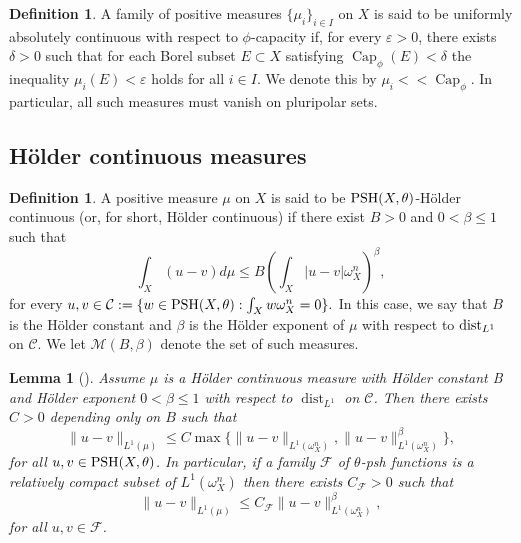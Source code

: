 \documentclass[a4paper,11pt]{amsart}
\numberwithin{equation}{section}
\newtheorem{proposition}[theorem]{Proposition}
\newtheorem{lemma}[theorem]{Lemma}
\theoremstyle{definition}
\newtheorem{definition}[theorem]{Definition}
\newcommand{\dist}{\mathop{\mathrm{dist}}\nolimits}
\newcommand{\PSH}{{\rm PSH}}
\newcommand{\capacity}{\mathop{\mathrm{Cap}}\nolimits}
\begin{document}
\begin{definition}
A family of positive measures $\{\mu_i \}_{i\in I}$ on $X$ is said to be uniformly absolutely
continuous with respect to $\phi$-capacity if, for every $\varepsilon>0$, there exists $\delta>0$ such that for each Borel subset $E\subset X$ satisfying $\capacity_\phi(E)<\delta$ the inequality $\mu_i(E)<\varepsilon$ holds for all $i\in I$. We denote this by $\mu_i<<\capacity_\phi$. In particular, all such measures must
vanish on pluripolar sets.
\end{definition}

\subsection{H\"older continuous measures}
\begin{definition}\label{def: holder}
	A positive measure $\mu$ on $X$ is said to be $\PSH(X, \theta)$-H\"older continuous
	(or, for short, H\"older continuous) if there exist $B>0$ and $0<\beta\leq 1$ such that
	\begin{equation*}
	    \int_{X}(u-v)d\mu\leq B \left(\int_X|u-v|\omega_X^n\right)^{\beta},
	\end{equation*}
for every $u, v\in\mathcal{C}:=\{w\in \PSH(X, \theta): \int_X w\omega_X^n=0 \}.$ In this case, we say that $B$ is
the H\"older constant and
$\beta$ is the H\"older exponent of $\mu$ with respect to ${\rm dist}_{L^1}$ on $\mathcal{C}$. We let $\mathcal{M}(B,\beta)$ denote the set of such measures.
\end{definition}
\begin{lemma}[{\cite[Lemma 3.3]{dinh2014characterization}}]\label{lem DN14 def holder}
		Assume $\mu$ is a H\"older continuous measure 
		with H\"older constant B and H\"older exponent $0<\beta\leq 1$
		 with respect to $\dist_{L^1}$ on $\mathcal{C}$. Then there exists $C>0$ depending only on $B$ such that
		\begin{equation*}
		    \|u-v\|_{L^1(\mu)}\leq C\max\big\{\|u-v\|_{L^1(\omega_X^n)}, \|u-v\|_{L^1(\omega_X^n)}^{\beta} \big\},
		\end{equation*}
	for all $u, v\in \PSH(X, \theta)$. In particular, if a family $\mathcal{F}$  of $\theta$-psh functions
	is a relatively compact subset of $L^1(\omega_X^n)$ then there exists $C_{\mathcal{F}}>0$ such that
	\begin{equation*}
	    \|u-v\|_{L^1(\mu)}\leq C_{\mathcal{F}} \|u-v\|_{L^1(\omega_X^n)}^{\beta},
	\end{equation*}
	for all $u, v\in\mathcal{F}$.
\end{lemma}
\end{document}
